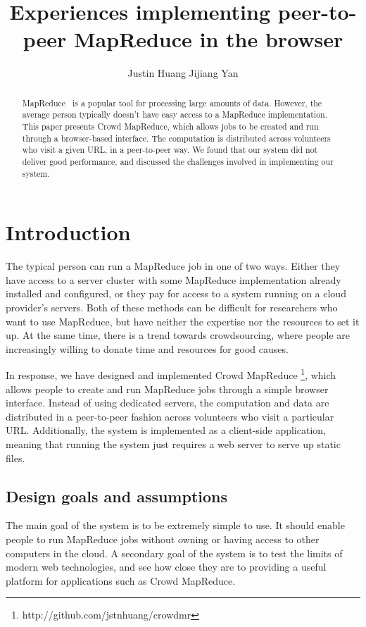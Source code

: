 \documentclass{article} %
\title{Experiences implementing peer-to-peer MapReduce in the browser}
\author{Justin Huang \And Jijiang Yan}
\begin{document}
\maketitle

\begin{abstract}
MapReduce~\cite{dean2008mapreduce} is a popular tool for processing large
amounts of data. However, the average person typically doesn't have easy access
to a MapReduce implementation. This paper presents Crowd MapReduce, which allows
jobs to be created and run through a browser-based interface. The computation is
distributed across volunteers who visit a given URL, in a peer-to-peer way. We
found that our system did not deliver good performance, and discussed the
challenges involved in implementing our system.
\end{abstract}

\section{Introduction}
The typical person can run a MapReduce job in one of two ways. Either they have
access to a server cluster with some MapReduce implementation already installed
and configured, or they pay for access to a system running on a cloud provider's
servers. Both of these methods can be difficult for researchers who want to use
MapReduce, but have neither the expertise nor the resources to set it up. At the
same time, there is a trend towards crowdsourcing, where people are
increasingly willing to donate time and resources for good causes.

In response, we have designed and implemented Crowd MapReduce
\footnote{http://github.com/jstnhuang/crowdmr}, which allows people to create
and run MapReduce jobs through a simple browser interface.
Instead of using dedicated servers, the computation and data are distributed in
a peer-to-peer fashion across volunteers who visit a particular URL.
Additionally, the system is implemented as a client-side application, meaning
that running the system just requires a web server to serve up static files.

\subsection{Design goals and assumptions}
The main goal of the system is to be extremely simple to use. It should enable
people to run MapReduce jobs without owning or having access to other computers
in the cloud. A secondary goal of the system is to test the limits of modern web
technologies, and see how close they are to providing a useful platform for
applications such as Crowd MapReduce.
\end{document}
